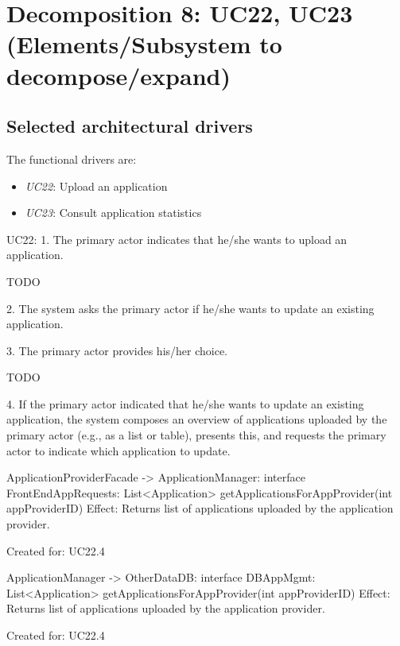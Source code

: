 \section{Decomposition 8: UC22, UC23 (Elements/Subsystem to decompose/expand)}


\subsection{Selected architectural drivers}
    The functional drivers are:
    \begin{itemize}
        \item \emph{UC22}: Upload an application  \\
        \item \emph{UC23}: Consult application statistics  \\
    \end{itemize}

    UC22:
        1. The primary actor indicates that he/she wants to upload an application.

            TODO

        2. The system asks the primary actor if he/she wants to update an existing application.

            

        3. The primary actor provides his/her choice.

            TODO

        4. If the primary actor indicated that he/she wants to update an existing application, the system composes an overview of applications uploaded by the primary actor (e.g., as a list or table), presents this, and requests the primary actor to indicate which application to update.

            ApplicationProviderFacade -> ApplicationManager: interface FrontEndAppRequests:
                                                List<Application> getApplicationsForAppProvider(int appProviderID)
                Effect: Returns list of applications uploaded by the application provider.
                \item Created for: UC22.4
            
            ApplicationManager -> OtherDataDB: interface DBAppMgmt:
                                                List<Application> getApplicationsForAppProvider(int appProviderID)
                Effect: Returns list of applications uploaded by the application provider.
                \item Created for: UC22.4
                

